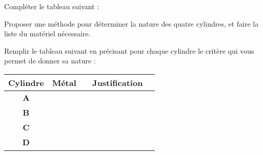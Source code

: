 \documentclass[a4paper,11pt]{exam}
\begin{document}
\begin{questions}


\question
Compléter le tableau suivant :

Proposer une méthode pour déterminer la nature des quatre cylindres, et faire la liste du matériel nécessaire.

\fillwithdottedlines{14cm}

\vspace*{1cm}

\question Remplir le tableau suivant en précisant pour chaque cylindre le critère qui vous permet de donner sa nature :


\begin{tabular}{|@{\ }c@{\ }|c|c|}
	\hline
	Cylindre            & Métal & \ \hspace*{3cm} Justification \hspace*{3cm}  \  \\ \hline
						&		&				\\
	$\mathbf{A}$        &       &               \\ 
						&		&				\\ \hline
						&		&				\\
	$\mathbf{B}$        &       &               \\ 
						&		&				\\ \hline
						&		&				\\
	$\mathbf{C}$        &       &               \\ 
						&		&				\\ \hline
						&		&				\\
	$\mathbf{D}$        &       &               \\
						&		&				\\ \hline
\end{tabular}

\end{questions}
 \label{LastPage}
 
 
\end{document}
